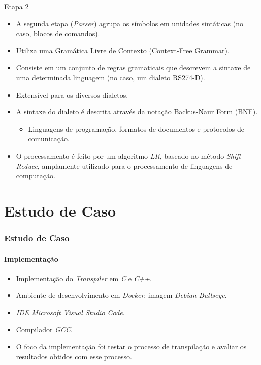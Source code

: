 \documentclass[aspectratio=169]{beamer}
\begin{document}
{\begin{frame}{Etapa 2}
  \begin{itemize}
    \item A segunda etapa (\emph{Parser}) agrupa os símbolos em unidades 
          sint\'aticas (no caso, blocos de comandos).
    \item Utiliza uma Gramática Livre de Contexto (Context-Free Grammar).
    \item Consiste em um conjunto de regras gramaticais que descrevem a 
          sintaxe de uma determinada linguagem (no caso, um dialeto RS274-D).
    \item Extensível para os diversos dialetos.
    \item A sintaxe do dialeto é descrita através da notação Backus-Naur 
          Form (BNF).
    \begin{itemize}
      \item Linguagens de programação, formatos de documentos e 
            protocolos de comunicação.
    \end{itemize}
    \item O processamento é feito por um algoritmo \emph{LR}, baseado no método 
          \emph{Shift-Reduce}, amplamente utilizado para o processamento 
          de linguagens de computação.
  \end{itemize}
\end{frame}




\section{Estudo de Caso}

\begin{frame}
  \frametitle{Estudo de Caso}
  \framesubtitle{Implementação}

  \begin{itemize}
    \item Implementação do \emph{Transpiler} em \emph{C} e \emph{C++}.
    \item Ambiente de desenvolvimento em \emph{Docker}, 
          imagem \emph{Debian Bullseye}.
    \item \emph{IDE Microsoft Visual Studio Code}.
    \item Compilador \emph{GCC}.
    \item O foco da implementação foi testar o processo de transpilação 
          e avaliar os resultados obtidos com esse processo.
  \end{itemize}


\end{frame}}
\end{document}
